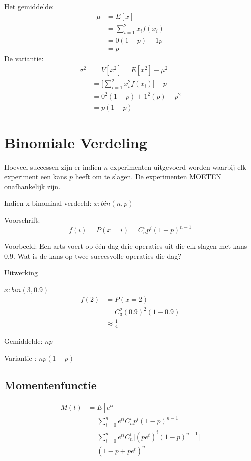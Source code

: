 \documentclass[12pt]{report}
\newcommand{\example}[2]{
      \hrulefill
      
      Voorbeeld: #1
      
      \underline{Uitwerking}
      
      #2
      
      \hrulefill
  }
\begin{document}
Het gemiddelde:
\begin{equation*}
 \begin{split}
  \mu & = E[x] \\
      & = \sum_{i = 1}^{2}x_if(x_i) \\
      & = 0(1 - p) + 1p \\
      & = p
 \end{split}
\end{equation*}
De variantie:
\begin{equation*}
 \begin{split}
  \sigma^2 & = V[x^2] = E[x^2] - \mu^2 \\
           & = \bigg[\sum_{i = 1}^{2}x_i^2f(x_i)\bigg] - p \\
           & = 0^2(1 - p) + 1^2(p) - p^2 \\
           & = p(1 - p)
 \end{split}
\end{equation*}
\section{Binomiale Verdeling}
Hoeveel successen zijn er indien $n$ experimenten uitgevoerd worden waarbij elk experiment een kans $p$ heeft om te slagen. De experimenten MOETEN onafhankelijk zijn.

Indien x binomiaal verdeeld: $x : bin(n, p)$

Voorschrift:
$$f(i) = P(x = i) = C_n^ip^i(1 - p)^{n - 1}$$

\example{
    Een arts voert op één dag drie operaties uit die elk slagen met kans 0.9. Wat is de kans op twee succesvolle operaties die dag?
}{
    $x : bin(3, 0.9)$
    \begin{equation*}
     \begin{split}
        f(2) & = P(x = 2) \\
             & = C_3^2(0.9)^2(1 - 0.9) \\
             & \approx \frac{1}{4}
     \end{split}
    \end{equation*}

}

Gemiddelde: $np$

Variantie : $np(1 - p)$
\subsection{Momentenfunctie}
\begin{equation*}
 \begin{split}
  M(t) & = E[e^{ti}] \\
       & = \sum_{i=0}^n e^{ti}C_n^ip^i(1 -p)^{n - 1} \\
       & = \sum_{i=0}^n e^{ti}C_n^i\bigg[(pe^t)^i(1 -p)^{n - 1}\bigg] \\ 
       & = ( 1 - p + pe^t)^n
 \end{split}
\end{equation*}
\end{document}
